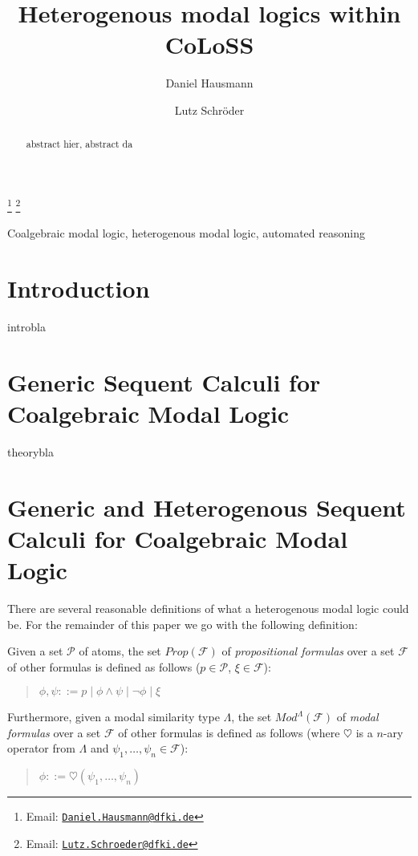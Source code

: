 \documentclass{entcs} \usepackage{entcsmacro}
\newcommand{\hearts}{\heartsuit}
\newcommand{\COLOSS}{{\textrm CoLoSS}}
\begin{document}
\begin{frontmatter}
  \title{Heterogenous modal logics within \COLOSS}
  \author[DFKI]{Daniel Hausmann}
  \author[DFKI,UBremen]{Lutz Schr\"oder}
  \address[DFKI]{DFKI Bremen, SKS}
  \address[UBremen]{Department of Mathematics and Computer Science, Universit\"at Bremen, Germany}
  \thanks[myemail]{Email: \href{mailto:Daniel.Hausmann@dfki.de} {\texttt{\normalshape Daniel.Hausmann@dfki.de}}}
  \thanks[coemail]{Email: \href{mailto:Lutz.Schroeder@dfki.de} {\texttt{\normalshape Lutz.Schroeder@dfki.de}}}
\begin{abstract} 
abstract hier, abstract da
\end{abstract}
\begin{keyword}
  Coalgebraic modal logic, heterogenous modal logic, automated reasoning
\end{keyword}
\end{frontmatter}
\section{Introduction}\label{intro}
introbla
 
\section{Generic Sequent Calculi for Coalgebraic Modal Logic}

theorybla

\section{Generic and Heterogenous Sequent Calculi for Coalgebraic Modal Logic}

There are several reasonable definitions of what a heterogenous modal logic could be. For the remainder
of this paper we go with the following definition:

\begin{definition}
Given a set $\mathcal{P}$ of atoms, the set $Prop(\mathcal{F})$ of \emph{propositional formulas} over
a set $\mathcal{F}$ of other formulas is defined as follows ($p\in\mathcal{P}$, $\xi\in\mathcal{F}$):
\begin{quote}
$\phi,\psi::= p\mid \phi\wedge\psi\mid\neg\phi\mid \xi$
\end{quote}
Furthermore, given a modal similarity type $\Lambda$, the set $Mod^\Lambda(\mathcal{F})$ of \emph{modal formulas}
over a set $\mathcal{F}$ of other formulas is defined as follows (where $\hearts$ is a $n$-ary operator
from $\Lambda$ and $\psi_1,\ldots,\psi_n\in\mathcal{F}$):
\begin{quote}
$\phi::= \hearts(\psi_1,\dots,\psi_n)$
\end{quote}
\end{definition}
\end{document}
